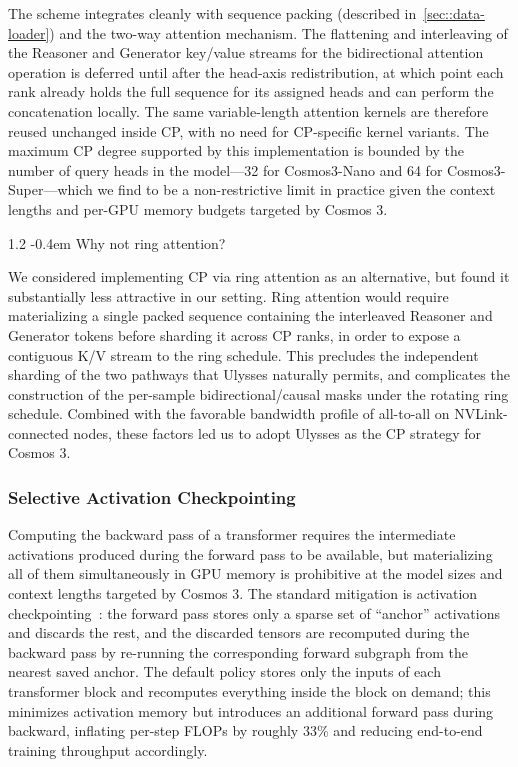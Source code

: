 \documentclass{llmxive}
\makeatletter
\providecommand{\paragraph}{  \@startsection{paragraph}{4}{\z@}    {1\baselineskip \@plus .2\baselineskip}    {-0.4em}    {\normalfont\normalsize\bfseries}}
\makeatother
\begin{document}
The scheme integrates cleanly with sequence packing (described in~\cref{sec::data-loader}) and the two-way attention mechanism. The flattening and interleaving of the Reasoner and Generator key/value streams for the bidirectional attention operation is deferred until after the head-axis redistribution, at which point each rank already holds the full sequence for its assigned heads and can perform the concatenation locally. The same variable-length attention kernels are therefore reused unchanged inside CP, with no need for CP-specific kernel variants. The maximum CP degree supported by this implementation is bounded by the number of query heads in the model---32 for Cosmos3-Nano and 64 for Cosmos3-Super---which we find to be a non-restrictive limit in practice given the context lengths and per-GPU memory budgets targeted by Cosmos 3.

\paragraph{Why not ring attention?}

We considered implementing CP via ring attention as an alternative, but found it substantially less attractive in our setting. Ring attention would require materializing a single packed sequence containing the interleaved Reasoner and Generator tokens before sharding it across CP ranks, in order to expose a contiguous K/V stream to the ring schedule. This precludes the independent sharding of the two pathways that Ulysses naturally permits, and complicates the construction of the per-sample bidirectional/causal masks under the rotating ring schedule. Combined with the favorable bandwidth profile of all-to-all on NVLink-connected nodes, these factors led us to adopt Ulysses as the CP strategy for Cosmos 3.

\subsubsection{Selective Activation Checkpointing}

Computing the backward pass of a transformer requires the intermediate activations produced during the forward pass to be available, but materializing all of them simultaneously in GPU memory is prohibitive at the model sizes and context lengths targeted by Cosmos 3. The standard mitigation is activation checkpointing~\citep{sac}: the forward pass stores only a sparse set of ``anchor'' activations and discards the rest, and the discarded tensors are recomputed during the backward pass by re-running the corresponding forward subgraph from the nearest saved anchor. The default policy stores only the inputs of each transformer block and recomputes everything inside the block on demand; this minimizes activation memory but introduces an additional forward pass during backward, inflating per-step FLOPs by roughly $33\%$ and reducing end-to-end training throughput accordingly.
\end{document}
